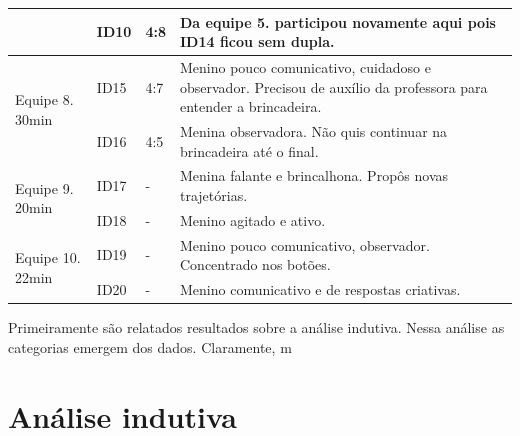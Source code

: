 \begin{quadro}[!h]
{\begin{footnotesize}
{\begin{tabular}{|l|l|l|p{11cm}|}
            \cline{2-4}
                                                            & ID10              & 4:8                          & Da equipe 5. participou novamente aqui pois ID14 ficou sem dupla.                                                  \\ 
            \hline
            \multirow{2}{*}{Equipe 8. 30min}                & ID15              & 4:7                          & Menino pouco comunicativo, cuidadoso e observador. Precisou de auxílio da professora para entender a brincadeira.  \\ 
            \cline{2-4}
                                                            & ID16              & 4:5                          & Menina observadora. Não quis continuar na brincadeira até o final.                                                 \\ 
            \hline
            \multirow{2}{*}{Equipe 9. 20min}                & ID17              & -                            & Menina falante e brincalhona. Propôs novas trajetórias.                                                            \\ 
            \cline{2-4}
                                                            & ID18              & -                            & Menino agitado e ativo.                                                                                            \\ 
            \hline
            \multirow{2}{*}{Equipe 10. 22min}               & ID19              & -                            & Menino pouco comunicativo, observador. Concentrado nos botões.                                                     \\ 
            \cline{2-4}
                                                            & ID20              & -                            & Menino comunicativo e de respostas criativas.                                                                                    \\
            \hline
            \end{tabular}
        }
        \end{footnotesize}
    }
\end{quadro}

Primeiramente são relatados resultados sobre a análise indutiva. Nessa análise as categorias emergem dos dados. Claramente, m

\section{Análise indutiva}

